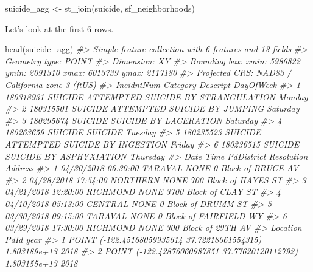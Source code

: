 \documentclass[
]{krantz}
\makeatletter
\newenvironment{Shaded}{\begin{snugshade}}{\end{snugshade}}
\newcommand{\CommentTok}[1]{\textcolor[rgb]{0.37,0.37,0.37}{\textit{#1}}}
\newcommand{\FunctionTok}[1]{\textcolor[rgb]{0,0,0}{#1}}
\newcommand{\NormalTok}[1]{#1}
\newcommand{\OtherTok}[1]{\textcolor[rgb]{0.37,0.37,0.37}{#1}}
\newenvironment{kframe}{%
\medskip{}
\setlength{\fboxsep}{.8em}
 \def\at@end@of@kframe{}%
 \ifinner\ifhmode%
  \def\at@end@of@kframe{\end{minipage}}%
  \begin{minipage}{\columnwidth}%
 \fi\fi%
 \def\FrameCommand##1{\hskip\@totalleftmargin \hskip-\fboxsep
 \colorbox{shadecolor}{##1}\hskip-\fboxsep
     \hskip-\linewidth \hskip-\@totalleftmargin \hskip\columnwidth}%
 \MakeFramed {\advance\hsize-\width
   \@totalleftmargin\z@ \linewidth\hsize
   \@setminipage}}%
 {\par\unskip\endMakeFramed%
 \at@end@of@kframe}
\renewenvironment{Shaded}{\begin{kframe}}{\end{kframe}}
\makeatother
\begin{document}
\begin{Shaded}
\begin{Highlighting}[]
\NormalTok{suicide\_agg }\OtherTok{\textless{}{-}} \FunctionTok{st\_join}\NormalTok{(suicide, sf\_neighborhoods)}
\end{Highlighting}
\end{Shaded}

Let's look at the first 6 rows.

\begin{Shaded}
\begin{Highlighting}[]
\FunctionTok{head}\NormalTok{(suicide\_agg)}
\CommentTok{\#\textgreater{} Simple feature collection with 6 features and 13 fields}
\CommentTok{\#\textgreater{} Geometry type: POINT}
\CommentTok{\#\textgreater{} Dimension:     XY}
\CommentTok{\#\textgreater{} Bounding box:  xmin: 5986822 ymin: 2091310 xmax: 6013739 ymax: 2117180}
\CommentTok{\#\textgreater{} Projected CRS: NAD83 / California zone 3 (ftUS)}
\CommentTok{\#\textgreater{}   IncidntNum Category                           Descript DayOfWeek}
\CommentTok{\#\textgreater{} 1  180318931  SUICIDE ATTEMPTED SUICIDE BY STRANGULATION    Monday}
\CommentTok{\#\textgreater{} 2  180315501  SUICIDE       ATTEMPTED SUICIDE BY JUMPING  Saturday}
\CommentTok{\#\textgreater{} 3  180295674  SUICIDE              SUICIDE BY LACERATION  Saturday}
\CommentTok{\#\textgreater{} 4  180263659  SUICIDE                            SUICIDE   Tuesday}
\CommentTok{\#\textgreater{} 5  180235523  SUICIDE     ATTEMPTED SUICIDE BY INGESTION    Friday}
\CommentTok{\#\textgreater{} 6  180236515  SUICIDE            SUICIDE BY ASPHYXIATION  Thursday}
\CommentTok{\#\textgreater{}         Date     Time PdDistrict Resolution                 Address}
\CommentTok{\#\textgreater{} 1 04/30/2018 06:30:00    TARAVAL       NONE     0 Block of BRUCE AV}
\CommentTok{\#\textgreater{} 2 04/28/2018 17:54:00   NORTHERN       NONE   700 Block of HAYES ST}
\CommentTok{\#\textgreater{} 3 04/21/2018 12:20:00   RICHMOND       NONE   3700 Block of CLAY ST}
\CommentTok{\#\textgreater{} 4 04/10/2018 05:13:00    CENTRAL       NONE     0 Block of DRUMM ST}
\CommentTok{\#\textgreater{} 5 03/30/2018 09:15:00    TARAVAL       NONE 0 Block of FAIRFIELD WY}
\CommentTok{\#\textgreater{} 6 03/29/2018 17:30:00   RICHMOND       NONE    300 Block of 29TH AV}
\CommentTok{\#\textgreater{}                                         Location         PdId year}
\CommentTok{\#\textgreater{} 1  POINT ({-}122.45168059935614 37.72218061554315) 1.803189e+13 2018}
\CommentTok{\#\textgreater{} 2  POINT ({-}122.42876060987851 37.77620120112792) 1.803155e+13 2018}

\end{Highlighting}
\end{Shaded}
\end{document}
